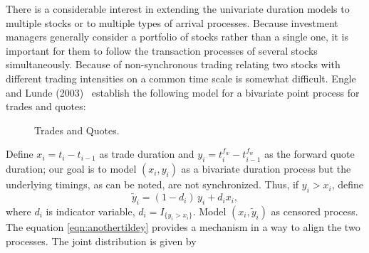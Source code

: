 There is a considerable interest in extending the univariate duration models to multiple stocks or to multiple types of arrival processes. Because investment managers generally consider a portfolio of stocks rather than a single one, it is important for them to follow the transaction processes of several stocks simultaneously. Because of non-synchronous trading relating two stocks with different trading intensities on a common time scale is somewhat difficult. Engle and Lunde (2003)~\cite{englelunde} establish the following model for a bivariate point process for trades and quotes:
	\begin{figure}[!ht]
	\centering
	\caption{Trades and Quotes.\label{fig:tradeactdoubline}}
	\end{figure}
Define $x_i = t_i - t_{i-1}$ as trade duration and $y_i = t_i^{f_w} - t_{i-1}^{f_w}$ as the forward quote duration; our goal is to model $(x_i,y_i)$ as a bivariate duration process but the underlying timings, as can be noted, are not synchronized. Thus, if $y_i > x_i$, define
	\begin{equation} \label{eqn:anothertildey}
	\widetilde{y}_i = (1 - d_i)\, y_i + d_ix_i,
	\end{equation}
where $d_i$ is indicator variable, $d_i = I_{\{y_i>x_i\}}$. Model $(x_i,\widetilde{y}_i)$ as censored process. The equation \eqref{eqn:anothertildey} provides a mechanism in a way to align the two processes. The joint distribution is given by
